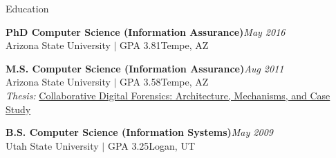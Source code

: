 \documentclass{resume} %
\begin{document}

\begin{rSection}{Education}

\textbf{PhD Computer Science (Information Assurance)}\hfill \emph{May 2016}\\
Arizona State University $\mid$ GPA 3.81\hfill {Tempe, AZ}

\textbf{M.S. Computer Science (Information Assurance)}\hfill \emph{Aug 2011}\\
Arizona State University $\mid$ GPA 3.58\hfill {Tempe, AZ}\\
\textit{Thesis:} \href{http://repository.asu.edu/attachments/56996/content/Mabey_asu_0010N_10959.pdf}{Collaborative Digital Forensics: Architecture, Mechanisms, and Case Study}

\textbf{B.S. Computer Science (Information Systems)}\hfill \emph{May 2009}\\
Utah State University $\mid$ GPA 3.25\hfill {Logan, UT}


\end{rSection}


\end{document}
